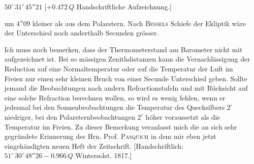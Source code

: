 \begin{center}\fontsize{10}{12}\selectfont $50^\circ\,31'\,45''21$ [$+0.472\,Q$ Handschriftliche Aufzeichnung.]\end{center}

\noindent um $4''09$ kleiner als aus dem Polarstern. Nach \textsc{Bessels} Schiefe der Ekliptik wäre der Unterschied noch anderthalb Secunden grösser.

\par\indent Ich muss noch bemerken, dass der Thermometerstand am Barometer nicht mit aufgezeichnet ist. Bei so mässigen Zenithdistanzen kann die Vernachlässigung der Reduction auf eine Normaltemperatur oder auf die Temperatur der Luft im Freien nur einen sehr kleinen Bruch von einer Secunde Unterschied geben. Sollte jemand die Beobachtungen nach andern Refractionstafeln und mit Rücksicht auf eine solche Refraction berechnen wollen, so wird es wenig fehlen, wenn er jedesmal bei den Sonnenbeobachtungen die Temperatur des Quecksilbers $2^\circ$ niedriger, bei den Polarsternbeobachtungen $2^\circ$ höher voraussetzt als die Temperatur im Freien. Zu dieser Bemerkung veranlasst mich die an sich sehr gegründete Erinnerung des Hrn. Prof. \textsc{Pasquich} in dem mir eben jetzt eingehändigten neuen Heft der Zeitschrift. [Handschriftlich: $51^\circ\,30'\,48''26 - 0.966\,Q$ Wintersolst. 1817.]

